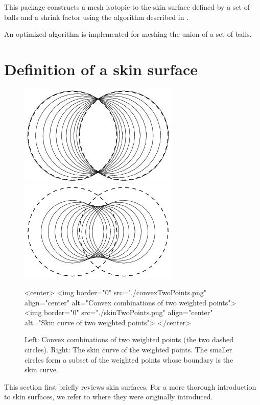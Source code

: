 This package constructs a mesh isotopic to the skin surface defined by
a set of balls and a shrink factor using the algorithm described in
\cite{cgal:kv-mssct-05}. %

An optimized algorithm is implemented for meshing the union of a set
of balls.

\section{Definition of a skin surface}
\label{sec:skindefinition}

\begin{figure}
  \begin{ccTexOnly}
    \begin{center}
      \includegraphics[width=.25\textwidth]{Skin_surface_3/convexTwoPoints}
      \includegraphics[width=.25\textwidth]{Skin_surface_3/skinTwoPoints}
    \end{center}
  \end{ccTexOnly}
  \begin{ccHtmlOnly}
    <center>
    <img border="0" src="./convexTwoPoints.png" align="center" alt="Convex combinations of two weighted points">
    <img border="0" src="./skinTwoPoints.png" align="center" alt="Skin
    curve of two weighted points">
    </center>
  \end{ccHtmlOnly}
  \caption{\label{fig:twoPoints} Left: Convex combinations of two
    weighted points (the two dashed circles). Right: The skin curve of
    the weighted points. The smaller circles form a subset of the
    weighted points whose boundary is the skin curve.}
\end{figure}

This section first briefly reviews skin surfaces. For a more thorough
introduction to skin surfaces, we refer to \cite{cgal:e-dssd-99} where
they were originally introduced.

